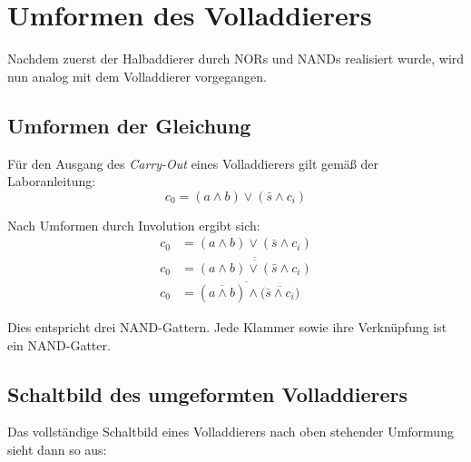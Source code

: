 \documentclass[
    paper=a4,
]{scrartcl}
\begin{document}

\section{Umformen des Volladdierers}
    Nachdem zuerst der Halbaddierer durch NORs und NANDs realisiert wurde, wird nun analog mit dem Volladdierer vorgegangen.

    \subsection{Umformen der Gleichung}

        Für den Ausgang des \textit{Carry-Out} eines Volladdierers gilt gemäß der Laboranleitung: 
        \[c_0 = (a \wedge b) \vee (\bar{s} \wedge c_i)\]

        Nach Umformen durch Involution ergibt sich:
        \begin{align*}
            c_0 &= (a \wedge b) \vee (\bar{s} \wedge c_i)\\
            c_0 &= \overline{\overline{(a \wedge b) \vee (\bar{s} \wedge c_i)}}\\
            c_0 &= \overline{(\overline{a \wedge b}) \wedge (\overline{\bar{s} \wedge c_i}})
        \end{align*}

        Dies entspricht drei NAND-Gattern. Jede Klammer sowie ihre Verknüpfung ist ein NAND-Gatter. 

    \subsection{Schaltbild des umgeformten Volladdierers}
        \label{subsec:2}
        Das vollständige Schaltbild eines Volladdierers nach oben stehender Umformung sieht dann so aus:
\end{document}
